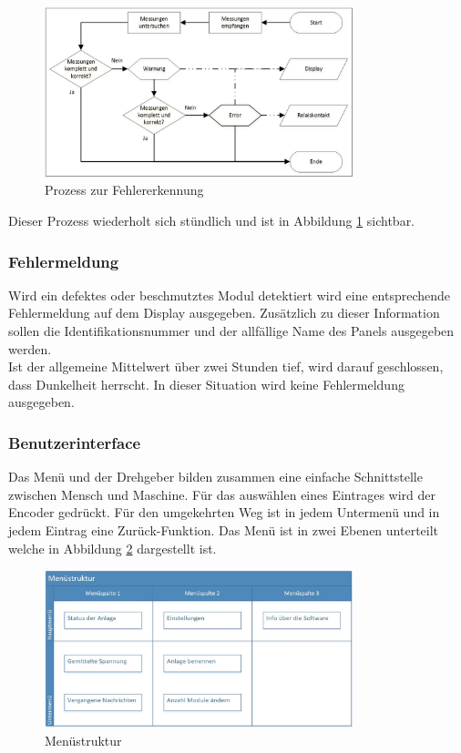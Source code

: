 \begin{figure}[htbp] 
  \centering
     \includegraphics[width=0.8\textwidth]{graphics/error-warning-scheme}
  \caption{Prozess zur Fehlererkennung}
  \label{fig:error-warning-scheme}
\end{figure}


Dieser Prozess wiederholt sich stündlich und ist in Abbildung \ref{fig:error-warning-scheme} sichtbar.

\subsubsection{Fehlermeldung}
Wird ein defektes oder beschmutztes Modul detektiert wird eine entsprechende Fehlermeldung auf dem Display ausgegeben. Zusätzlich zu dieser Information sollen die Identifikationsnummer und der allfällige Name des Panels ausgegeben werden.\\
Ist der allgemeine Mittelwert über zwei Stunden tief, wird darauf geschlossen, dass Dunkelheit herrscht. In dieser Situation wird keine Fehlermeldung ausgegeben.

\subsubsection{Benutzerinterface}
Das Menü und der Drehgeber bilden zusammen eine einfache Schnittstelle zwischen Mensch und Maschine. Für das auswählen eines Eintrages wird der Encoder gedrückt. Für den umgekehrten Weg ist in jedem Untermenü und in jedem Eintrag eine Zurück-Funktion. Das Menü ist in zwei Ebenen unterteilt welche in Abbildung \ref{fig:structure-menu} dargestellt ist.
\newpage
\begin{figure}[htbp] 
  \centering
     \includegraphics[width=0.8\textwidth]{graphics/structure-menu}
  \caption{Menüstruktur}
  \label{fig:structure-menu}
\end{figure}

